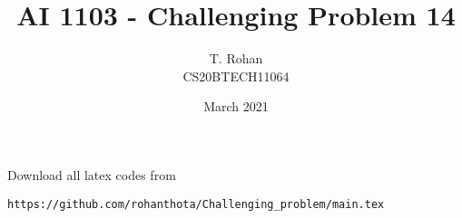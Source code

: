 \documentclass[journal,12pt,twocolumn]{IEEEtran}
\date{March 2021}
\begin{document}
\newcommand{\BEQA}{\begin{eqnarray}}
\newcommand{\EEQA}{\end{eqnarray}}
\newcommand{\define}{\stackrel{\triangle}{=}}

\raggedbottom
\setlength{\parindent}{0pt}
\providecommand{\mbf}{\mathbf}
\providecommand{\pr}[1]{\ensuremath{\Pr\left(#1\right)}}
\providecommand{\qfunc}[1]{\ensuremath{Q\left(#1\right)}}
\providecommand{\fn}[1]{\ensuremath{f\left(#1\right)}}
\providecommand{\e}[1]{\ensuremath{E\left(#1\right)}}
\providecommand{\sbrak}[1]{\ensuremath{{}\left[#1\right]}}
\providecommand{\lsbrak}[1]{\ensuremath{{}\left[#1\right.}}
\providecommand{\rsbrak}[1]{\ensuremath{{}\left.#1\right]}}
\providecommand{\brak}[1]{\ensuremath{\left(#1\right)}}
\providecommand{\lbrak}[1]{\ensuremath{\left(#1\right.}}
\providecommand{\rbrak}[1]{\ensuremath{\left.#1\right)}}
\providecommand{\cbrak}[1]{\ensuremath{\left\{#1\right\}}}
\providecommand{\lcbrak}[1]{\ensuremath{\left\{#1\right.}}
\providecommand{\rcbrak}[1]{\ensuremath{\left.#1\right\}}}
\theoremstyle{remark}
\newtheorem{rem}{Remark}
\newcommand{\sgn}{\mathop{\mathrm{sgn}}}
\providecommand{\abs}[1]{\vert#1\vert}
\providecommand{\res}[1]{\Res\displaylimits_{#1}} 
\providecommand{\norm}[1]{\lVert#1\rVert}
\providecommand{\mtx}[1]{\mathbf{#1}}
\providecommand{\mean}[1]{E[ #1 ]}
\providecommand{\fourier}{\overset{\mathcal{F}}{ \rightleftharpoons}}
\providecommand{\system}{\overset{\mathcal{H}}{ \longleftrightarrow}}
\newcommand{\solution}{\noindent \textbf{Solution: }}
\newcommand{\cosec}{\,\text{cosec}\,}
\providecommand{\dec}[2]{\ensuremath{\overset{#1}{\underset{#2}{\gtrless}}}}
\newcommand{\myvec}[1]{\ensuremath{\begin{pmatrix}#1\end{pmatrix}}}
\newcommand{\mydet}[1]{\ensuremath{\begin{vmatrix}#1\end{vmatrix}}}
\makeatletter
{}
\makeatother
\let\StandardTheFigure\thefigure
\let\vec\mathbf
\renewcommand{\thefigure}{\theproblem}
\def\putbox#1#2#3{\makebox[0in][l]{\makebox[#1][l]{}\raisebox{\baselineskip}[0in][0in]{\raisebox{#2}[0in][0in]{#3}}}}
     \def\rightbox#1{\makebox[0in][r]{#1}}
     \def\centbox#1{\makebox[0in]{#1}}
     \def\topbox#1{\raisebox{-\baselineskip}[0in][0in]{#1}}
     \def\midbox#1{\raisebox{-0.5\baselineskip}[0in][0in]{#1}}
\vspace{3cm}
\title{AI 1103 - Challenging Problem 14}
\author{T. Rohan \\ CS20BTECH11064}
\maketitle
\newpage
\bigskip
\renewcommand{\thefigure}{\theenumi}
\renewcommand{\thetable}{\theenumi}
Download all latex codes from 
\begin{lstlisting}
https://github.com/rohanthota/Challenging_problem/main.tex
\end{lstlisting}
\end{document}
